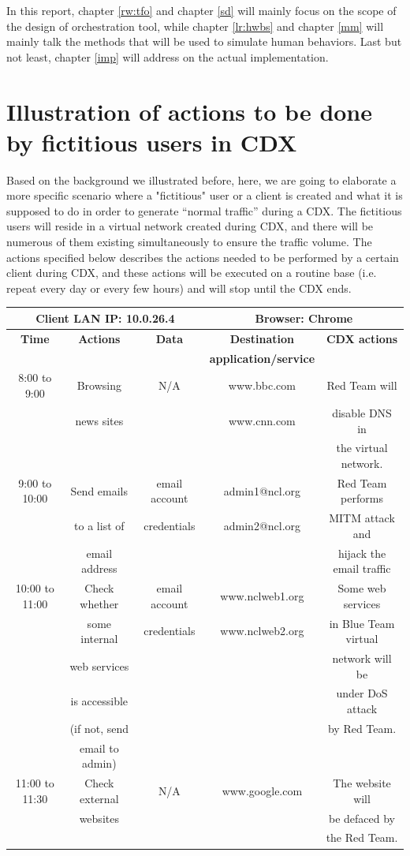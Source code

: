 \documentclass[12pt]{report}
\begin{document}
In this report, chapter \ref{rw:tfo} and chapter \ref{sd} will mainly focus on the scope of the design of orchestration tool, while chapter \ref{lr:hwbs} and chapter \ref{mm} will mainly talk the methods that will be used to simulate human behaviors. Last but not least, chapter \ref{imp} will address on the actual implementation.

\section{Illustration of actions to be done by fictitious users in CDX}

Based on the background we illustrated before, here, we are going to elaborate a more specific scenario where a "fictitious" user or a client is created and what it is supposed to do in order to generate “normal traffic” during a CDX. The fictitious users will reside in a virtual network created during CDX, and there will be numerous of them existing simultaneously to ensure the traffic volume. The actions specified below describes the actions needed to be performed by a certain client during CDX, and these actions will be executed on a routine base (i.e. repeat every day or every few hours) and will stop until the CDX ends.\\

\setlength{\parindent}{0pt}
\begin{tabular}{ | c | c | c | c | c |}
\hline
\multicolumn{3}{|c|}{Client LAN IP: 10.0.26.4}&\multicolumn{2}{|c|}{Browser: Chrome}\\
\hline
\hline
\textbf{Time} & \textbf{Actions} & \textbf{Data} & \textbf{Destination} & \textbf{CDX actions}\\
& & & \textbf{application/service} & \\
\hline
8:00 to 9:00 & Browsing & N/A & www.bbc.com & Red Team will\\
& news sites & & www.cnn.com & disable DNS in \\
& & & & the virtual network.\\
\hline
9:00 to 10:00 & Send emails & email account & admin1@ncl.org & Red Team performs\\
& to a list of & credentials & admin2@ncl.org & MITM attack and \\
& email address & & & hijack the email traffic\\
\hline
10:00 to 11:00 & Check whether & email account & www.nclweb1.org & Some web services\\
& some internal & credentials  & www.nclweb2.org & in Blue Team virtual \\
& web services & & & network will be \\
& is accessible & & & under DoS attack\\
& (if not, send & & & by Red Team.\\
& email to admin) & & & \\
\hline
11:00 to 11:30 & Check external & N/A & www.google.com & The website will\\
& websites & & & be defaced by\\
& & & & the Red Team. \\
\hline
\end{tabular}\\
\end{document}
